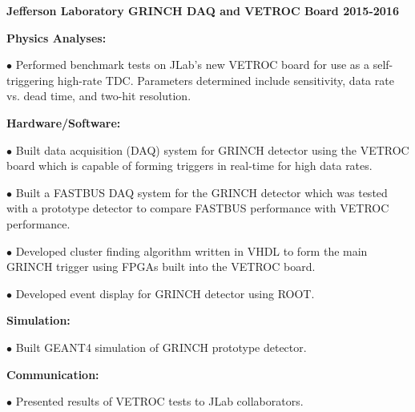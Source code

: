 \documentclass[letterpaper,10pt]{article}
\renewenvironment{itemize}{
  \begin{list}{}{
    \setlength{\leftmargin}{1.5em}
  }
}{
  \end{list}
}
\begin{document}
{\begin{itemize}
 \vspace{3mm}
 
\item {\large {\bf Jefferson Laboratory GRINCH DAQ and VETROC Board 2015-2016} }

 \begin{itemize}\itemsep5pt \parskip0pt 
  \item \textbf{Physics Analyses:}
    \begin{itemize}\itemsep5pt \parskip0pt 
     \item $\bullet$ Performed benchmark tests on JLab's new VETROC board for use as a self-triggering high-rate TDC. Parameters determined include sensitivity, data rate vs. dead time, and two-hit resolution.
     \end{itemize}

  \item \textbf{Hardware/Software:}
    \begin{itemize}\itemsep5pt \parskip0pt 
     \item $\bullet$ Built data acquisition (DAQ) system for GRINCH detector using the VETROC board which is capable of forming triggers in real-time for high data rates. 
     \item $\bullet$ Built a FASTBUS DAQ system for the GRINCH detector which was tested with a prototype detector to compare FASTBUS performance with VETROC performance.
     \item $\bullet$ Developed cluster finding algorithm written in VHDL to form the main GRINCH trigger using FPGAs built into the VETROC board.
     \item $\bullet$ Developed event display for GRINCH detector using ROOT. 
    \end{itemize}
    
   \item \textbf{Simulation:}
     \begin{itemize}\itemsep5pt \parskip0pt 
      \item $\bullet$ Built GEANT4 simulation of GRINCH prototype detector.
     \end{itemize} 
     
   \item \textbf{Communication:}
	\begin{itemize}\itemsep5pt
		\item $\bullet$ Presented results of VETROC tests to JLab collaborators.
	\end{itemize}
 \end{itemize}


\end{itemize}}
\end{document}
